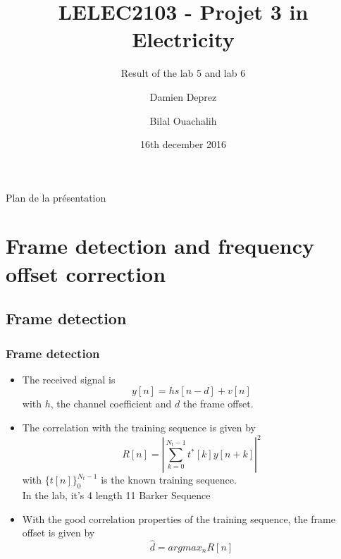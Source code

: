 \documentclass[11pt]{beamer}
\title{LELEC2103 - Projet 3 in Electricity}
\subtitle[\ldots]{Result of the lab 5 and lab 6}
\author[D. Deprez\and B. Ouachalih]{Damien Deprez\and Bilal Ouachalih}
\institute{EPL}
\date{16th december 2016}
\begin{document}
{
	\begin{frame}[noframenumbering]
		\titlepage
	\end{frame}
} 

{
	\begin{frame}[noframenumbering]{Plan de la présentation}
		\tableofcontents
	\end{frame}
}

\section{Frame detection and frequency offset correction}

\subsection{Frame detection}

\begin{frame}
\frametitle{Frame detection}
\begin{itemize}
\item The received signal is
\begin{equation}
y[n] = hs[n-d] + v[n]
\end{equation}
with $h$, the channel coefficient and $d$ the frame offset.
\item The correlation with the training sequence is given by
\begin{equation}
R[n] = \left| \sum_{k=0}^{N_t-1} t^*[k]y[n+k] \right|^2
\end{equation}
with $\{t[n]\}_0^{N_t-1}$ is the known training sequence. \\
In the lab, it's 4 length 11 Barker Sequence
\item With the good correlation properties of the training sequence, the frame offset is given by 
\begin{equation}
\hat{d} = argmax_n{R[n]}
\end{equation}
\end{itemize}

\end{frame}
\end{document}
